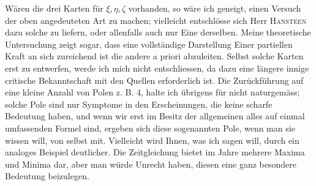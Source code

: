 \indent Wären die drei Karten für \(\xi,\eta,\zeta\) vorhanden, so wäre ich geneigt, einen
Versuch der oben angedeuteten Art zu machen; vielleicht entschlösse sich
Herr \textsc{Hansteen} dazu solche zu liefern, oder allenfalls auch nur Eine derselben.
Meine theoretische Untersuchung zeigt sogar, dass eine vollständige
Darstellung Einer partiellen Kraft an sich zureichend ist die andere a priori
abzuleiten. Selbst solche Karten erst zu entwerfen, werde ich mich nicht entschliessen,
da dazu eine längere innige critische Bekanntschaft mit den Quellen
erforderlich ist. Die Zurückführung auf eine kleine Anzahl von Polen z. B. 4,
halte ich übrigens für nicht naturgemäss; solche Pole sind nur Symptome in
den Erscheinungen, die keine scharfe Bedeutung haben, und wenn wir erst im
Besitz der allgemeinen alles auf einmal umfassenden Formel sind, ergeben
sich diese sogenannten Pole, wenn man sie wissen will, von selbst mit. Vielleicht
wird Ihnen, was ich sagen will, durch ein analoges Beispiel deutlicher.
Die Zeitgleichung bietet im Jahre mehrere Maxima und Minima dar, aber
man würde Unrecht haben, diesen eine ganz besondere Bedeutung beizulegen.


